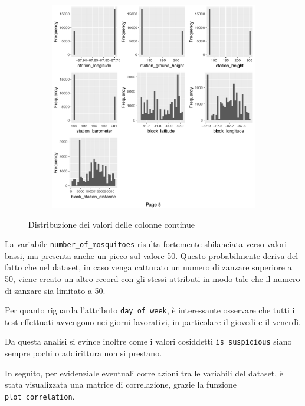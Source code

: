 \begin{figure}[H]
	\ContinuedFloat 
	\begin{subfigure}[t]{0.49\textwidth}
		\includegraphics[width=\textwidth]{images/ml/plot_histogram5}
	\end{subfigure}
\caption{Distribuzione dei valori delle colonne continue}
\label{fig:plot_histogram}
\end{figure}

La variabile \texttt{number\_of\_mosquitoes} risulta fortemente sbilanciata 
verso valori bassi, ma presenta anche un picco sul valore 50. Questo 
probabilmente deriva del fatto che nel dataset, in caso venga catturato un 
numero di zanzare superiore a 50, viene creato un altro record con 
gli stessi attributi in modo tale che il numero di zanzare sia limitato a 50.  

Per quanto riguarda l'attributo \texttt{day\_of\_week}, è interessante 
osservare che tutti i test effettuati avvengono nei giorni lavorativi, in 
particolare il giovedì e il venerdì. 

Da questa analisi si evince inoltre come i valori cosiddetti 
\texttt{is\_suspicious} siano sempre pochi o addirittura non si prestano.

In seguito, per evidenziale eventuali correlazioni tra le variabili del 
dataset, è stata visualizzata una matrice di correlazione, grazie la funzione 
\texttt{plot\_correlation}.

